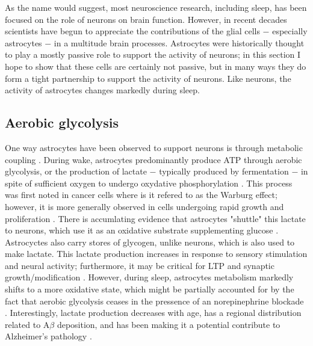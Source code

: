 As the name would suggest, most neuroscience research, including sleep, has been focused on the role of neurons on brain function. However, in recent decades scientists have begun to appreciate the contributions of the glial cells $-$ especially astrocytes $-$ in a multitude brain processes. Astrocytes were historically thought to play a mostly passive role to support the activity of neurons; in this section I hope to show that these cells are certainly not passive, but in many ways they do form a tight partnership to support the activity of neurons.  Like neurons, the activity of astrocytes changes markedly during sleep.

\subsection*{Aerobic glycolysis}
One way astrocytes have been observed to support neurons is through metabolic coupling \citep{DiNuzzo2017}. During wake, astrocytes predominantly produce ATP through aerobic glycolysis, or the production of lactate $-$ typically produced by fermentation $-$ in spite of sufficient oxygen to undergo oxydative phosphorylation \citep{Vaishnavi2010, Pellerin2007, Machler2016}. This process was first noted in cancer cells where is it refered to as the Warburg effect; however, it is more generally observed in cells undergoing rapid growth and proliferation \citep{Lunt2011}. There is accumlating evidence that astrocytes "shuttle" this lactate to neurons, which use it as an oxidative substrate supplementing glucose \citep{Allaman2011,Pellerin2007}. Astrocyctes also carry stores of glycogen, unlike neurons, which is also used to make lactate. This lactate production increases in response to sensory stimulation and neural activity; furthermore, it may be critical for LTP and synaptic growth/modification \citep{Kasischke2004,Suzuki2011, Goyal2014}. However, during sleep, astrocytes metabolism markedly shifts to a more oxidative state, which might be partially accounted for by the fact that aerobic glycolysis ceases in the pressence of an norepinephrine blockade \citep{Dienel2016}. Interestingly, lactate production decreases with age, has a regional distribution related to A$\beta$ deposition, and has been  making it a potential contribute to Alzheimer's pathology \citep{Vlassenko2010, Vlassenko2018, Goyal2017}.

